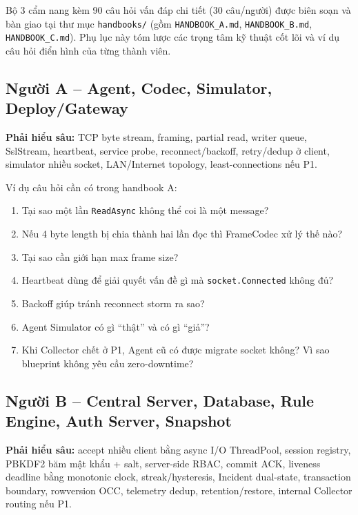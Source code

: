 
Bộ 3 cẩm nang kèm 90 câu hỏi vấn đáp chi tiết (30 câu/người) được biên soạn và bàn giao tại thư mục \texttt{handbooks/} (gồm \texttt{HANDBOOK\_A.md}, \texttt{HANDBOOK\_B.md}, \texttt{HANDBOOK\_C.md}). Phụ lục này tóm lược các trọng tâm kỹ thuật cốt lõi và ví dụ câu hỏi điển hình của từng thành viên.

\subsection*{Người A -- Agent, Codec, Simulator, Deploy/Gateway}

\textbf{Phải hiểu sâu:} TCP byte stream, framing, partial read, writer queue, SslStream, heartbeat, service probe, reconnect/backoff, retry/dedup ở client, simulator nhiều socket, LAN/Internet topology, least-connections nếu P1.

\begin{vivabox}
Ví dụ câu hỏi cần có trong handbook A:
\begin{enumerate}
    \item Tại sao một lần \texttt{ReadAsync} không thể coi là một message?
    \item Nếu 4 byte length bị chia thành hai lần đọc thì FrameCodec xử lý thế nào?
    \item Tại sao cần giới hạn max frame size?
    \item Heartbeat dùng để giải quyết vấn đề gì mà \texttt{socket.Connected} không đủ?
    \item Backoff giúp tránh reconnect storm ra sao?
    \item Agent Simulator có gì ``thật'' và có gì ``giả''?
    \item Khi Collector chết ở P1, Agent cũ có được migrate socket không? Vì sao blueprint không yêu cầu zero-downtime?
\end{enumerate}
\end{vivabox}

\subsection*{Người B -- Central Server, Database, Rule Engine, Auth Server, Snapshot}

\textbf{Phải hiểu sâu:} accept nhiều client bằng async I/O ThreadPool, session registry, PBKDF2 băm mật khẩu + salt, server-side RBAC, commit ACK, liveness deadline bằng monotonic clock, streak/hysteresis, Incident dual-state, transaction boundary, rowversion OCC, telemetry dedup, retention/restore, internal Collector routing nếu P1.

